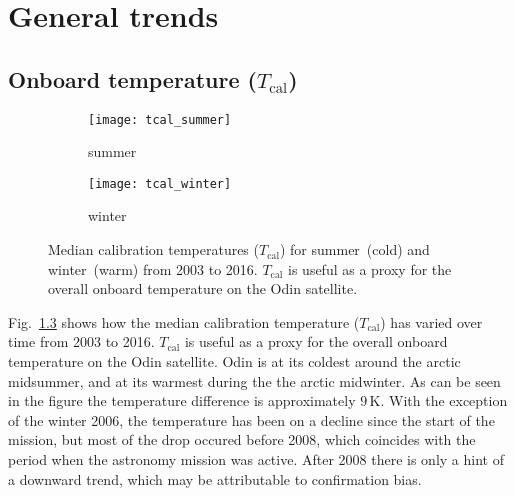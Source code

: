 \chapter{General trends}
\label{ch:general}

\section{Onboard temperature ($T_\mathrm{cal}$)}
\label{sec:Tcal}

\begin{figure}[ht]
    \centering
    \begin{subfigure}[b]{0.9545\textwidth}
        \texttt{[image: tcal\_summer]}
        \caption{summer}\label{fig:tcal:summer}
    \end{subfigure}
    \begin{subfigure}[b]{0.9545\textwidth}
        \texttt{[image: tcal\_winter]}
        \caption{winter}\label{fig:tcal:winter}
    \end{subfigure}
    \caption{Median calibration temperatures ($T_\mathrm{cal}$) for
        summer~(cold) and winter~(warm) from 2003 to 2016. $T_\mathrm{cal}$ is
        useful as a proxy for the overall onboard temperature on the Odin
        satellite.}\label{fig:tcal}
\end{figure}

\noindent
Fig.~\ref{fig:tcal} shows how the median calibration temperature
($T_\mathrm{cal}$) has varied over time from 2003 to 2016.  $T_\mathrm{cal}$ is
useful as a proxy for the overall onboard temperature on the Odin satellite.
Odin is at its coldest around the arctic midsummer, and at its warmest during
the the arctic midwinter.  As can be seen in the figure the temperature
difference is approximately $9\,\mathrm{K}$.  With the exception of the
winter 2006, the temperature has been on a decline since the start of the
mission, but most of the drop occured before 2008, which coincides with the
period when the astronomy mission was active.  After 2008 there is only a hint
of a downward trend, which may be attributable to confirmation bias.
